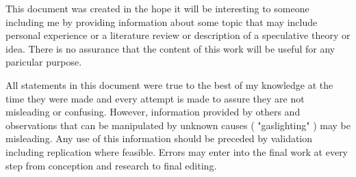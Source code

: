 
This document was created in the hope it will be interesting to
someone including me by providing information 
about some topic that may include personal experience or a literature
review or description of a speculative theory or idea.
There is no assurance that the content of this work will be
useful for any paricular purpose. 


All statements in this document were true to the best of my knowledge
at the time they were made and every attempt is made to assure
they are not misleading or confusing. However, information provided by
others and observations that can be manipulated by unknown causes  
( "gaslighting" ) may be misleading. Any use of this information should
be preceded by validation including replication where feasible.
Errors may enter into the final work at every step from conception
and research to final editing. 

